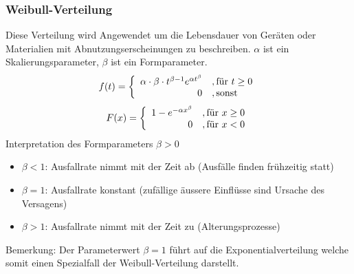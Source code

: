 \subsubsection{Weibull-Verteilung}
Diese Verteilung wird Angewendet um die Lebensdauer von Geräten oder Materialien mit Abnutzungserscheinungen zu beschreiben. $\alpha$ ist ein Skalierungsparameter, $\beta$ ist ein Formparameter.
\begin{equation}
f(t)=\left\{\begin{array}{r l}\alpha \cdot \beta \cdot t^{\beta-1}e^{\alpha t^{\beta}}&, \mbox{für }t \geq 0\\0 &, \mbox{sonst}\end{array}\right.
\end{equation}
\begin{equation}
F(x)=\left\{\begin{array}{r l} 1-e^{-\alpha x^{\beta}}&, \mbox{für }x\geq 0 \\ 0&, \mbox{für }x<0\end{array}\right.
\end{equation}
Interpretation des Formparameters $\beta > 0$
\begin{itemize}
	\item $\beta < 1$: Ausfallrate nimmt mit der Zeit ab (Ausfälle finden frühzeitig statt)
	\item $\beta = 1$: Ausfallrate konstant (zufällige äussere Einflüsse sind Ursache des Versagens)
	\item $\beta > 1$: Ausfallrate nimmt mit der Zeit zu (Alterungsprozesse)
\end{itemize}
Bemerkung: Der Parameterwert $\beta = 1$ führt auf die Exponentialverteilung welche somit einen Spezialfall der Weibull-Verteilung darstellt.
